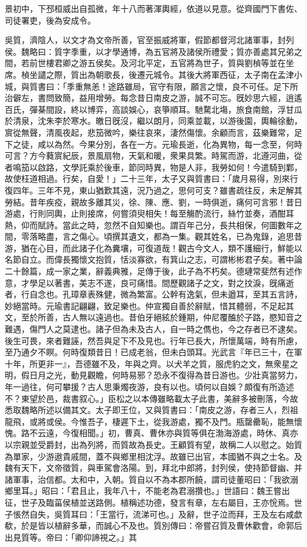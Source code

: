 \begin{pinyinscope}
景初中，下邳桓威出自孤微，年十八而著渾輿經，依道以見意。從齊國門下書佐、司徒署吏，後為安成令。

吳質，濟陰人，以文才為文帝所善，官至振威將軍，假節都督河北諸軍事，封列侯。魏略曰：質字季重，以才學通博，為五官將及諸侯所禮愛；質亦善處其兄弟之間，若前世樓君卿之游五侯矣。及河北平定，五官將為世子，質與劉楨等並在坐席。楨坐譴之際，質出為朝歌長，後遷元城令。其後大將軍西征，太子南在孟津小城，與質書曰：「季重無恙！途路雖局，官守有限，願言之懷，良不可任。足下所治僻左，書問致簡，益用增勞。每念昔日南皮之游，誠不可忘。旣妙思六經，逍遙百氏，彈棊間設，終以博弈，高談娛心，哀箏順耳。馳騖北塲，旅食南館，浮甘瓜於清泉，沈朱李於寒水。皦日旣沒，繼以朗月，同乘並載，以游後園，輿輪徐動，賔從無聲，清風夜起，悲笳微吟，樂往哀來，淒然傷懷。余顧而言，茲樂難常，足下之徒，咸以為然。今果分別，各在一方。元瑜長逝，化為異物，每一念至，何時可言？方今蕤賔紀辰，景風扇物，天氣和暖，衆果具繁。時駕而游，北遵河曲，從者鳴笳以啟路，文學託乘於後車，節同時異，物是人非，我勞如何！今遣騎到鄴，故使枉道相過。行矣，自愛！」二十三年，太子又與質書曰：「歲月易得，別來行復四年。三年不見，東山猶歎其遠，況乃過之，思何可支？雖書疏往反，未足解其勞結。昔年疾疫，親故多離其災，徐、陳、應、劉，一時俱逝，痛何可言邪！昔日游處，行則同輿，止則接席，何嘗須臾相失！每至觴酌流行，絲竹並奏，酒酣耳熱，仰而賦詩。當此之時，忽然不自知樂也。謂百年己分，長共相保，何圖數年之間，零落略盡，言之傷心。頃撰其遺文，都為一集。觀其姓名，已為鬼錄，追思昔游，猶在心目，而此諸子化為糞壤，可復道哉！觀古今文人，類不護細行，鮮能以名節自立。而偉長獨懷文抱質，恬淡寡欲，有箕山之志，可謂彬彬君子矣。著中論二十餘篇，成一家之業，辭義典雅，足傳于後，此子為不朽矣。德璉常斐然有述作意，才學足以著書，美志不遂，良可痛惜。間歷觀諸子之文，對之抆淚，旣痛逝者，行自念也。孔璋章表殊健，微為繁富。公幹有逸氣，但未遒耳，至其五言詩，妙絕當時。元瑜書記翩翩，致足樂也。仲宣獨自善於辭賦，惜其體弱，不足起其文，至於所善，古人無以遠過也。昔伯牙絕絃於鍾期，仲尼覆醢於子路，愍知音之難遇，傷門人之莫逮也。諸子但為未及古人，自一時之儁也，今之存者已不逮矣。後生可畏，來者難誣，然吾與足下不及見也。行年已長大，所懷萬端，時有所慮，至乃通夕不瞑。何時復類昔日！已成老翁，但未白頭耳。光武言『年已三十，在軍十年，所更非一』，吾德雖不及，年與之齊。以犬羊之質，服虎豹之文，無衆星之明，假日月之光，動見觀瞻，何時易邪？恐永不復得為昔日游也。少壯真當努力，年一過往，何可攀援？古人思秉燭夜游，良有以也。頃何以自娛？頗復有所造述不？東望於邑，裁書叙心。」臣松之以本傳雖略載太子此書，美辭多被刪落，今故悉取魏略所述以備其文。太子即王位，又與質書曰：「南皮之游，存者三人，烈祖龍飛，或將或侯。今惟吾子，棲遲下土，從我游處，獨不及門。瓶罄罍恥，能無懷愧。路不云遠，今復相聞。」初，曹真、曹休亦與質等俱在渤海游處，時休、真亦以宗親並受爵封，出為列將，而質故為長史。王顧質有望，故稱二人以慰之。始質為單家，少游遨貴戚間，蓋不與鄉里相沈浮。故雖已出官，本國猶不與之士名。及魏有天下，文帝徵質，與車駕會洛陽。到，拜北中郎將，封列侯，使持節督幽、并諸軍事，治信都。太和中，入朝。質自以不為本郡所饒，謂司徒董昭曰：「我欲溺鄉里耳。」昭曰：「君且止，我年八十，不能老為君溺攢也。」世語曰：魏王嘗出征，世子及臨菑侯植並送路側。植稱述功德，發言有章，左右屬目，王亦恱焉。世子悵然自失，吳質耳曰：「王當行，流涕可也。」及辭，世子泣而拜，王及左右咸歔欷，於是皆以植辭多華，而誠心不及也。質別傳曰：帝嘗召質及曹休歡會，命郭后出見質等。帝曰：「卿仰諦視之。」其
\end{pinyinscope}
